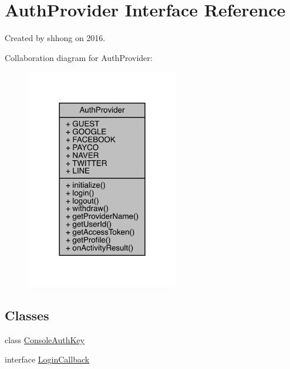 \hypertarget{interfacecom_1_1toast_1_1android_1_1gamebase_1_1base_1_1auth_1_1_auth_provider}{}\section{Auth\+Provider Interface Reference}
\label{interfacecom_1_1toast_1_1android_1_1gamebase_1_1base_1_1auth_1_1_auth_provider}


Created by shhong on 2016.  




Collaboration diagram for Auth\+Provider\+:\nopagebreak
\begin{figure}[H]
\begin{center}
\leavevmode
\includegraphics[width=189pt]{interfacecom_1_1toast_1_1android_1_1gamebase_1_1base_1_1auth_1_1_auth_provider__coll__graph}
\end{center}
\end{figure}
\subsection*{Classes}
\begin{DoxyCompactItemize}
\item 
class \hyperlink{classcom_1_1toast_1_1android_1_1gamebase_1_1base_1_1auth_1_1_auth_provider_1_1_console_auth_key}{Console\+Auth\+Key}
\item 
interface \hyperlink{interfacecom_1_1toast_1_1android_1_1gamebase_1_1base_1_1auth_1_1_auth_provider_1_1_login_callback}{Login\+Callback}
\end{DoxyCompactItemize}
